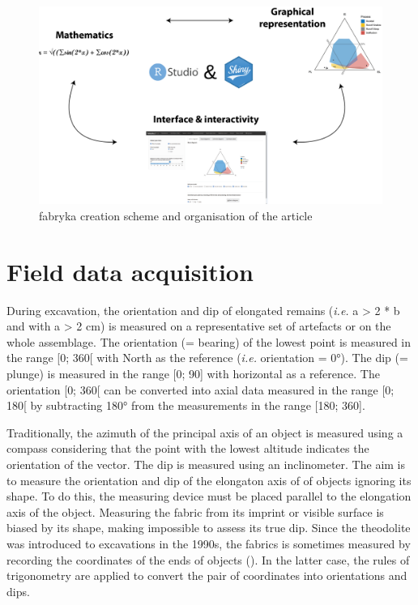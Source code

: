 \documentclass[
]{article}
\begin{document}
\begin{figure} [h]
\centering
  \includegraphics[width=15cm]{figure/presentation_applications.png}
  \caption{fabryka creation scheme and organisation of the article}
\label{fig:figure_presentation}
\end{figure}

\section{Field data acquisition}\label{field-data-acquisition}

During excavation, the orientation and dip of elongated remains
(\emph{i.e.} a \textgreater{} 2 * b and with a \textgreater{} 2 cm) is
measured on a representative set of artefacts or on the whole
assemblage. The orientation (= bearing) of the lowest point is measured
in the range {[}0; 360{[} with North as the reference (\emph{i.e.}
orientation = 0°). The dip (= plunge) is measured in the range {[}0;
90{]} with horizontal as a reference. The orientation {[}0; 360{[} can
be converted into axial data measured in the range {[}0; 180{[} by
subtracting 180° from the measurements in the range {[}180; 360{]}.

Traditionally, the azimuth of the principal axis of an object is
measured using a compass considering that the point with the lowest
altitude indicates the orientation of the vector. The dip is measured
using an inclinometer. The aim is to measure the orientation and dip of
the elongaton axis of of objects ignoring its shape. To do this, the
measuring device must be placed parallel to the elongation axis of the
object. Measuring the fabric from its imprint or visible surface is
biased by its shape, making impossible to assess its true dip. Since the
theodolite was introduced to excavations in the 1990s, the fabrics is
sometimes measured by recording the coordinates of the ends of objects
(). In the
latter case, the rules of trigonometry are applied to convert the pair
of coordinates into orientations and dips.
\end{document}
